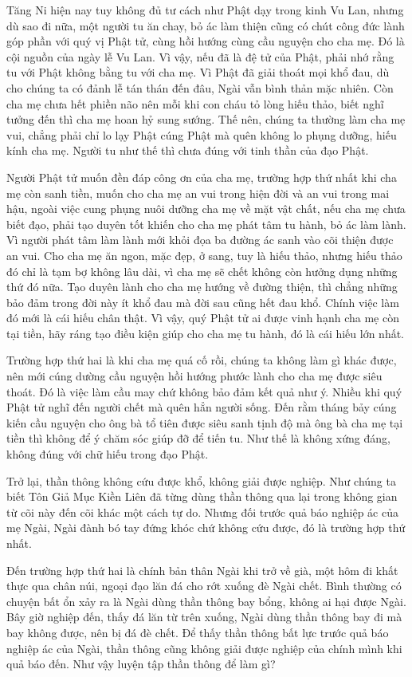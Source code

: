 \documentclass[
  12pt,
  oneside]{book}
\begin{document}
Tăng Ni hiện nay tuy không đủ tư cách như Phật dạy trong kinh Vu Lan, nhưng dù sao đi nữa, một người tu ăn chay, bỏ ác làm thiện cũng có chút công đức lành góp phần với quý vị Phật tử, cùng hồi hướng cùng cầu nguyện cho cha mẹ. Đó là cội nguồn của ngày lễ Vu Lan. Vì vậy, nếu đã là đệ tử của Phật, phải nhớ rằng tu với Phật không bằng tu với cha mẹ. Vì Phật đã giải thoát mọi khổ đau, dù cho chúng ta có đảnh lễ tán thán đến đâu, Ngài vẫn bình thản mặc nhiên. Còn cha mẹ chưa hết phiền não nên mỗi khi con cháu tỏ lòng hiếu thảo, biết nghĩ tưởng đến thì cha mẹ hoan hỷ sung sướng. Thế nên, chúng ta thường làm cha mẹ vui, chẳng phải chỉ lo lạy Phật cúng Phật mà quên không lo phụng dưỡng, hiếu kính cha mẹ. Người tu như thế thì chưa đúng với tinh thần của đạo Phật.

Người Phật tử muốn đền đáp công ơn của cha mẹ, trường hợp thứ nhất khi cha mẹ còn sanh tiền, muốn cho cha mẹ an vui trong hiện đời và an vui trong mai hậu, ngoài việc cung phụng nuôi dưỡng cha mẹ về mặt vật chất, nếu cha mẹ chưa biết đạo, phải tạo duyên tốt khiến cho cha mẹ phát tâm tu hành, bỏ ác làm lành. Vì người phát tâm làm lành mới khỏi đọa ba đường ác sanh vào cõi thiện được an vui. Cho cha mẹ ăn ngon, mặc đẹp, ở sang, tuy là hiếu thảo, nhưng hiếu thảo đó chỉ là tạm bợ không lâu dài, vì cha mẹ sẽ chết không còn hưởng dụng những thứ đó nữa. Tạo duyên lành cho cha mẹ hướng về đường thiện, thì chẳng những bảo đảm trong đời này ít khổ đau mà đời sau cũng hết đau khổ. Chính việc làm đó mới là cái hiếu chân thật. Vì vậy, quý Phật tử ai được vinh hạnh cha mẹ còn tại tiền, hãy ráng tạo điều kiện giúp cho cha mẹ tu hành, đó là cái hiếu lớn nhất.

Trường hợp thứ hai là khi cha mẹ quá cố rồi, chúng ta không làm gì khác được, nên mới cúng dường cầu nguyện hồi hướng phước lành cho cha mẹ được siêu thoát. Đó là việc làm cầu may chứ không bảo đảm kết quả như ý. Nhiều khi quý Phật tử nghĩ đến người chết mà quên hẳn người sống. Đến rằm tháng bảy cúng kiến cầu nguyện cho ông bà tổ tiên được siêu sanh tịnh độ mà ông bà cha mẹ tại tiền thì không để ý chăm sóc giúp đỡ để tiến tu. Như thế là không xứng đáng, không đúng với chữ hiếu trong đạo Phật.

Trở lại, thần thông không cứu được khổ, không giải được nghiệp. Như chúng ta biết Tôn Giả Mục Kiền Liên đã từng dùng thần thông qua lại trong không gian từ cõi này đến cõi khác một cách tự do. Nhưng đối trước quả báo nghiệp ác của mẹ Ngài, Ngài đành bó tay đứng khóc chứ không cứu được, đó là trường hợp thứ nhất.

Đến trường hợp thứ hai là chính bản thân Ngài khi trở về già, một hôm đi khất thực qua chân núi, ngoại đạo lăn đá cho rớt xuống đè Ngài chết. Bình thường có chuyện bất ổn xảy ra là Ngài dùng thần thông bay bổng, không ai hại được Ngài. Bây giờ nghiệp đến, thấy đá lăn từ trên xuống, Ngài dùng thần thông bay đi mà bay không được, nên bị đá đè chết. Để thấy thần thông bất lực trước quả báo nghiệp ác của Ngài, thần thông cũng không giải được nghiệp của chính mình khi quả báo đến. Như vậy luyện tập thần thông để làm gì?
\end{document}
